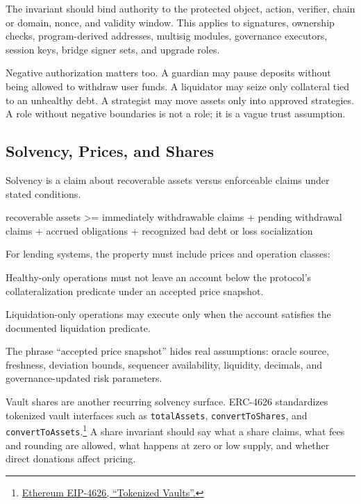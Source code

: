 The invariant should bind authority to the protected object, action, verifier, chain or domain, nonce, and validity window. This applies to signatures, ownership checks, program-derived addresses, multisig modules, governance executors, session keys, bridge signer sets, and upgrade roles.

Negative authorization matters too. A guardian may pause deposits without being allowed to withdraw user funds. A liquidator may seize only collateral tied to an unhealthy debt. A strategist may move assets only into approved strategies. A role without negative boundaries is not a role; it is a vague trust assumption.

\subsection{Solvency, Prices, and Shares}

Solvency is a claim about recoverable assets versus enforceable claims under stated conditions.

\begin{codeblock}
recoverable assets
    >= immediately withdrawable claims
     + pending withdrawal claims
     + accrued obligations
     + recognized bad debt or loss socialization
\end{codeblock}

For lending systems, the property must include prices and operation classes:

\begin{codeblock}
Healthy-only operations must not leave an account below the
protocol's collateralization predicate under an accepted price snapshot.

Liquidation-only operations may execute only when the account satisfies
the documented liquidation predicate.
\end{codeblock}

The phrase ``accepted price snapshot'' hides real assumptions: oracle source, freshness, deviation bounds, sequencer availability, liquidity, decimals, and governance-updated risk parameters.

Vault shares are another recurring solvency surface. ERC-4626 standardizes tokenized vault interfaces such as \texttt{totalAssets}, \texttt{convertToShares}, and \texttt{convertToAssets}.\footnote{\href{https://eips.ethereum.org/EIPS/eip-4626}{Ethereum EIP-4626, ``Tokenized Vaults''.}} A share invariant should say what a share claims, what fees and rounding are allowed, what happens at zero or low supply, and whether direct donations affect pricing.

